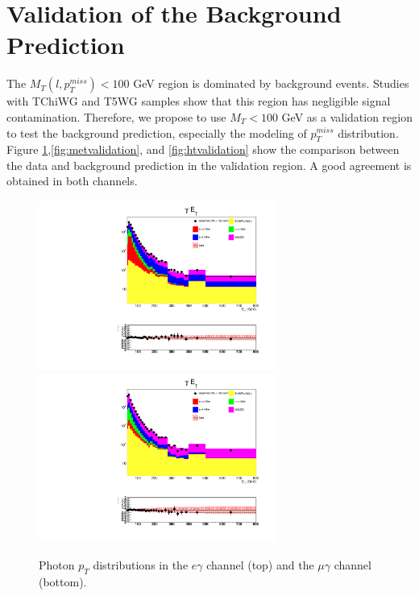 \documentclass[thesis.tex]{subfiles}
\renewcommand\_{\textunderscore\allowbreak}
\begin{document}
\section{Validation of the Background Prediction}

The $M_T(l, p_{T}^{miss}) < 100$ GeV region is dominated by background events. Studies with TChiWG and T5WG samples show that this region has negligible signal contamination. Therefore, we propose to use $M_T < 100$ GeV as a validation region to test the background prediction, especially the modeling of $p_T^{miss}$ distribution. Figure \ref{fig:etvalidation},\ref{fig:metvalidation}, and \ref{fig:htvalidation} show the comparison between the data and background prediction in the validation region. A good agreement is obtained in both channels.

\begin{figure}
  \centering
    \includegraphics[width=0.7\textwidth]{Figures/VALID_egamma_2016ReMiniAOD_pt.pdf} \\
    \includegraphics[width=0.7\textwidth]{Figures/VALID_mg_2016ReMiniAOD_pt.pdf} \\
  \caption{Photon $p_T$ distributions in the $e\gamma$ channel (top) and the $\mu\gamma$ channel (bottom).}
    \label{fig:etvalidation}
\end{figure}
\end{document}
